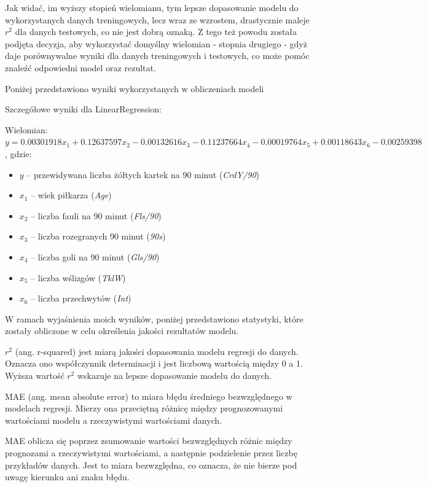 \documentclass{article}
\begin{document}
Jak widać, im wyższy stopień wielomianu, tym lepsze dopasowanie modelu do wykorzystanych danych treningowych, lecz wraz ze wzrostem, drastycznie maleje $r^2$ dla danych testowych, co nie jest dobrą oznaką. Z tego też powodu została podjęta decyzja, aby wykorzystać domyślny wielomian - stopnia drugiego - gdyż daje porównywalne wyniki dla danych treningowych i testowych, co może pomóc znaleźć odpowiedni model oraz rezultat.

\newpage
Poniżej przedstawiono wyniki wykorzystanych w obliczeniach modeli
\vspace{0.5cm}

Szczegółowe wyniki dla LinearRegression:
\vspace{0.5cm}

Wielomian:
$y = 0.00301918x_1 + 0.12637597x_2 - 0.00132616x_3 - 0.11237664x_4 - 0.00019764x_5 + 0.00118643x_6 - 0.00259398$, gdzie:

\begin{itemize}[label={}, leftmargin=*]
  \item $y$ -- przewidywana liczba żółtych kartek na 90 minut (\textit{CrdY/90})
  \item $x_1$ -- wiek piłkarza (\textit{Age})
  \item $x_2$ -- liczba fauli na 90 minut (\textit{Fls/90})
  \item $x_3$ -- liczba rozegranych 90 minut (\textit{90s})
  \item $x_4$ -- liczba goli na 90 minut (\textit{Gls/90})
  \item $x_5$ -- liczba wślizgów (\textit{TklW})
  \item $x_6$ -- liczba przechwytów (\textit{Int})
\end{itemize}

W ramach wyjaśnienia moich wyników, poniżej przedstawiono statystyki, które zostały obliczone w celu określenia jakości rezultatów modelu.

$r^2$ (ang. r-squared) jest miarą jakości dopasowania modelu regresji do danych. Oznacza ono współczynnik determinacji i jest liczbową wartością między 0 a 1. Wyższa wartość $r^2$ wskazuje na lepsze dopasowanie modelu do danych.
 
MAE (ang. mean absolute error) to miara błędu średniego bezwzględnego w modelach regresji. Mierzy ona przeciętną różnicę między prognozowanymi wartościami modelu a rzeczywistymi wartościami danych.

MAE oblicza się poprzez zsumowanie wartości bezwzględnych różnic między prognozami a rzeczywistymi wartościami, a następnie podzielenie przez liczbę przykładów danych. Jest to miara bezwzględna, co oznacza, że nie bierze pod uwagę kierunku ani znaku błędu.
\end{document}
